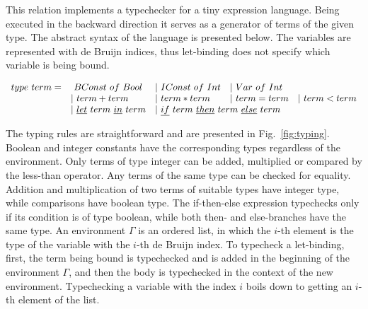 This relation implements a typechecker for a tiny expression language.
Being executed in the backward direction it serves as a generator of terms of the given type.
The abstract syntax of the language is presented below.
The variables are represented with de Bruijn indices, thus let-binding does not specify which variable is being bound.

\[\begin{array}{lllll}
  type \ term = &\ BConst \ of \ Bool &| \ IConst \ of \ Int &| \ Var \ of \ Int & \\
  & | \ term + term &| \ term * term &| \ term = term &| \ term < term \\
  &| \ \underline{let} \ term \ \underline{in} \ term
  &\multicolumn{2}{l}{| \ \underline{if} \ term \ \underline{then} \ term \ \underline{else} \ term} &
\end{array}\]

The typing rules are straightforward and are presented in Fig.~\ref{fig:typing}.
Boolean and integer constants have the corresponding types regardless of the environment.
Only terms of type integer can be added, multiplied or compared by the less-than operator.
Any terms of the same type can be checked for equality.
Addition and multiplication of two terms of suitable types have integer type, while comparisons have boolean type.
The if-then-else expression typechecks only if its condition is of type boolean, while both then- and else-branches have the same type.
An environment $\Gamma$ is an ordered list, in which the $i$-th element is the type of the variable with the $i$-th de Bruijn index.
To typecheck a let-binding, first, the term being bound is typechecked and is added in the beginning of the environment $\Gamma$, and then the body is typechecked in the context of the new environment.
Typechecking a variable with the index $i$ boils down to getting an $i$-th element of the list.

